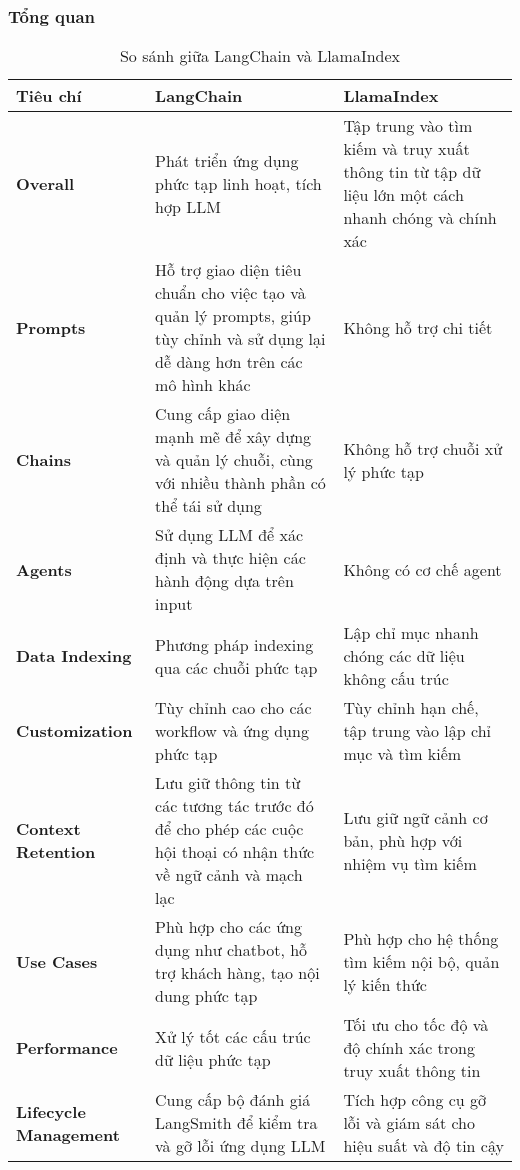 \subsubsection{Tổng quan}
\begin{table}[H]
\centering
\caption{So sánh giữa LangChain và LlamaIndex}
\begin{tabular}{|p{3.5cm}|p{6cm}|p{6cm}|}
\hline
\textbf{Tiêu chí} & \textbf{LangChain} & \textbf{LlamaIndex} \\ \hline
\textbf{Overall} & Phát triển ứng dụng phức tạp linh hoạt, tích hợp LLM & Tập trung vào tìm kiếm và truy xuất thông tin từ tập dữ liệu lớn một cách nhanh chóng và chính xác \\ \hline
\textbf{Prompts} & Hỗ trợ giao diện tiêu chuẩn cho việc tạo và quản lý prompts, giúp tùy chỉnh và sử dụng lại dễ dàng hơn trên các mô hình khác & Không hỗ trợ chi tiết \\ \hline
\textbf{Chains} & Cung cấp giao diện mạnh mẽ để xây dựng và quản lý chuỗi, cùng với nhiều thành phần có thể tái sử dụng & Không hỗ trợ chuỗi xử lý phức tạp \\ \hline
\textbf{Agents} & Sử dụng LLM để xác định và thực hiện các hành động dựa trên input & Không có cơ chế agent \\ \hline
\textbf{Data Indexing} & Phương pháp indexing qua các chuỗi phức tạp & Lập chỉ mục nhanh chóng các dữ liệu không cấu trúc \\ \hline
\textbf{Customization} & Tùy chỉnh cao cho các workflow và ứng dụng phức tạp & Tùy chỉnh hạn chế, tập trung vào lập chỉ mục và tìm kiếm \\ \hline
\textbf{Context Retention} & Lưu giữ thông tin từ các tương tác trước đó để cho phép các cuộc hội thoại có nhận thức về ngữ cảnh và mạch lạc & Lưu giữ ngữ cảnh cơ bản, phù hợp với nhiệm vụ tìm kiếm \\ \hline
\textbf{Use Cases} & Phù hợp cho các ứng dụng như chatbot, hỗ trợ khách hàng, tạo nội dung phức tạp & Phù hợp cho hệ thống tìm kiếm nội bộ, quản lý kiến thức \\ \hline
\textbf{Performance} & Xử lý tốt các cấu trúc dữ liệu phức tạp & Tối ưu cho tốc độ và độ chính xác trong truy xuất thông tin \\ \hline
\textbf{Lifecycle Management} & Cung cấp bộ đánh giá LangSmith để kiểm tra và gỡ lỗi ứng dụng LLM & Tích hợp công cụ gỡ lỗi và giám sát cho hiệu suất và độ tin cậy \\ \hline
\end{tabular}

\end{table}

